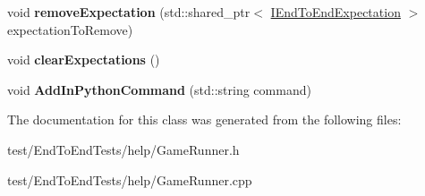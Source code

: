 \begin{DoxyCompactItemize}
\item 
void {\bfseries remove\+Expectation} (std\+::shared\+\_\+ptr$<$ \hyperlink{classIEndToEndExpectation}{I\+End\+To\+End\+Expectation} $>$ expectation\+To\+Remove)\hypertarget{classGameRunner_ae2dd7b431fa584325b01a70567624f01}{}\label{classGameRunner_ae2dd7b431fa584325b01a70567624f01}

\item 
void {\bfseries clear\+Expectations} ()\hypertarget{classGameRunner_ad49be011e850c41e81e263cdff67bc80}{}\label{classGameRunner_ad49be011e850c41e81e263cdff67bc80}

\item 
void {\bfseries Add\+In\+Python\+Command} (std\+::string command)\hypertarget{classGameRunner_a88185dd88e7090e8db1fe5f563ef9227}{}\label{classGameRunner_a88185dd88e7090e8db1fe5f563ef9227}

\end{DoxyCompactItemize}


The documentation for this class was generated from the following files\+:\begin{DoxyCompactItemize}
\item 
test/\+End\+To\+End\+Tests/help/Game\+Runner.\+h\item 
test/\+End\+To\+End\+Tests/help/Game\+Runner.\+cpp\end{DoxyCompactItemize}
